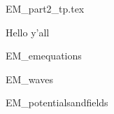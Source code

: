 \documentclass[oneside, 12pt]{book}
\begin{document}
\frontmatter \pagestyle{empty}

{EM_part2_tp.tex}

\begin{bookabstract}
Hello y'all
\end{bookabstract}

\centeredtoc

\mainmatter \pagestyle{mypage2} \normalfont

{EM_emequations}


{EM_waves}

{EM_potentialsandfields}








\backmatter

\end{document}
